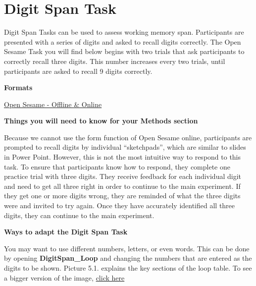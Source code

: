 \documentclass[
]{book}
\begin{document}
\hypertarget{digit-span-task}{%
\section{Digit Span Task}\label{digit-span-task}}

Digit Span Tasks can be used to assess working memory span. Participants are presented with a series of digits and asked to recall digits correctly. The Open Sesame Task you will find below begins with two trials that ask participants to correctly recall three digits. This number increases every two trials, until participants are asked to recall 9 digits correctly.

\textbf{Formats}

\href{https://github.com/jmattschey/MScConversionExperiments/blob/master/GitHub/DigitSpan_Online.zip}{Open Sesame - Offline \& Online}

\textbf{Things you will need to know for your Methods section}

Because we cannot use the form function of Open Sesame online, participants are prompted to recall digits by individual ``sketchpads'', which are similar to slides in Power Point. However, this is not the most intuitive way to respond to this task. To ensure that participants know how to respond, they complete one practice trial with three digits. They receive feedback for each individual digit and need to get all three right in order to continue to the main experiment. If they get one or more digits wrong, they are reminded of what the three digits were and invited to try again. Once they have accurately identified all three digits, they can continue to the main experiment.

\textbf{Ways to adapt the Digit Span Task}

You may want to use different numbers, letters, or even words. This can be done by opening \textbf{DigitSpan\_Loop} and changing the numbers that are entered as the digits to be shown. Picture 5.1. explains the key sections of the loop table. To see a bigger version of the image, \href{https://raw.githubusercontent.com/jmattschey/MScConversionExperiments/master/images/ChangeDigitSpan.png}{click here}
\end{document}
